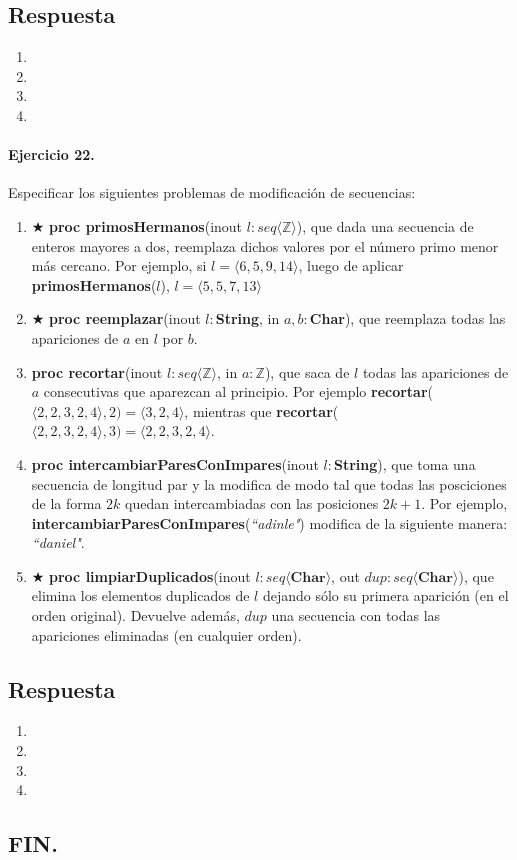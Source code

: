 \documentclass[a4paper]{article}
\begin{document}
\subsection*{Respuesta}
	\begin{enumerate}[label=\alph*)]
		\item
		\item
		\item
		\item
	\end{enumerate}
	
\paragraph*{Ejercicio 22.} Especificar los siguientes problemas de modificación de secuencias:
	\begin{enumerate}[label=\alph*)]
		\item $\bigstar$ \textbf{proc primosHermanos}(inout $l:seq\langle \mathbb{Z}\rangle$), que dada una secuencia de enteros mayores a dos, reemplaza dichos valores por el número primo menor más cercano. Por ejemplo, si $l=\langle 6,5,9,14 \rangle$, luego de aplicar \textbf{primosHermanos}($l$), $l=\langle 5,5,7,13 \rangle$
		\item $\bigstar$ \textbf{proc reemplazar}(inout $l:$\textbf{String}, in $a,b:$\textbf{Char}), que reemplaza todas las apariciones de $a$ en $l$ por $b$.
		\item \textbf{proc recortar}(inout $l:seq\langle \mathbb{Z}\rangle$, in $a:\mathbb{Z}$), que saca de $l$ todas las apariciones de $a$ consecutivas que aparezcan al principio. Por ejemplo \textbf{recortar}($\langle 2,2,3,2,4\rangle ,2)=\langle 3,2,4\rangle$, mientras que \textbf{recortar}($\langle 2,2,3,2,4\rangle ,3)=\langle 2,2,3,2,4\rangle$.
		\item \textbf{proc intercambiarParesConImpares}(inout $l:$\textbf{String}), que toma una secuencia de longitud par y la modifica de modo tal que todas las posciciones de la forma $2k$ quedan intercambiadas con las posiciones $2k+1$. Por ejemplo, \textbf{intercambiarParesConImpares}(\textit{``adinle"}) modifica de la siguiente manera: \textit{``daniel"}.
		\item $\bigstar$ \textbf{proc limpiarDuplicados}(inout $l: seq\langle \mathbb{\textbf{Char}}\rangle$, out $dup:seq\langle \mathbb{\textbf{Char}}\rangle$), que elimina los elementos duplicados de $l$ dejando sólo su primera aparición (en el orden original). Devuelve además, $dup$ una secuencia con todas las apariciones eliminadas (en cualquier orden).
	\end{enumerate}
\subsection*{Respuesta}
	\begin{enumerate}[label=\alph*)]
		\item
		\item
		\item
		\item
	\end{enumerate}

\begin{center}
\section*{FIN.}
\end{center}
\end{document}
